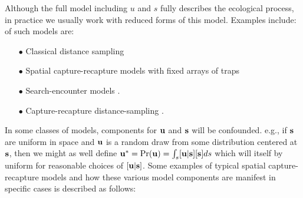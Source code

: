 Although the full model including $u$ and $s$ fully describes the
ecological process, in practice we usually work with reduced forms of
this model. Examples include:
of such models are:
\begin{enumerate}
\item[$\bullet$] Classical distance sampling
\item[$\bullet$] Spatial capture-recapture models with fixed arrays of traps
  \citep{efford:2004, borchers_efford:2008, royle_etal:2009ecol,
    royle_etal:2009jae, gardner_etal:2010ecol,royle_etal:2011jwm}
\item[$\bullet$] Search-encounter models \citep{royle_young:2008, royle_etal:2011mee}.
\item[$\bullet$] Capture-recapture distance-sampling \citep{borchers_etal:1998}.
\end{enumerate}
In some classes of models, components for ${\bf u}$ and ${\bf s}$ will be confounded.
e.g., if ${\bf s}$ are uniform in space and ${\bf u}$ is
a random draw from some distribution centered at ${\bf s}$, then we might as
well define ${\bf u}^{*}=\Pr({\bf u})=\int_{s} [{\bf u}|{\bf s}][{\bf
  s}]ds$ which will itself by uniform
for reasonable choices of $[{\bf u}|{\bf s}]$.  Some examples
of typical spatial capture-recapture models and how
these various model components are manifest in specific cases is
described as follows:
